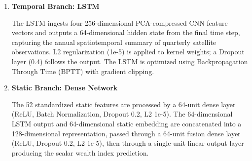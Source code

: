 \documentclass[12pt, letterpaper]{article}
\numberwithin{figure}{section}
\numberwithin{table}{section}
\begin{document}
\begin{enumerate}[label=\textbf{\Alph*.}, leftmargin=*]
  \item \textbf{Temporal Branch: LSTM}

    \hspace*{0.5in} The LSTM ingests four 256-dimensional
    PCA-compressed CNN feature
    vectors and outputs a 64-dimensional hidden state from the final
    time step, capturing the annual spatiotemporal summary of quarterly
    satellite observations. L2 regularization (1e-5) is applied to
    kernel weights; a Dropout layer (0.4) follows the output. The LSTM
    is optimized using Backpropagation Through Time (BPTT) with
    gradient clipping.
  \item \textbf{Static Branch: Dense Network}

    \hspace*{0.5in} The 52 standardized static features are processed
    by a 64-unit
    dense layer (ReLU, Batch Normalization, Dropout 0.2, L2 1e-5). The
    64-dimensional LSTM output and 64-dimensional static embedding are
    concatenated into a 128-dimensional representation, passed through
    a 64-unit fusion dense layer (ReLU, Dropout 0.2, L2 1e-5), then
    through a single-unit linear output layer producing the scalar
    wealth index prediction.

\end{enumerate}
\end{document}

